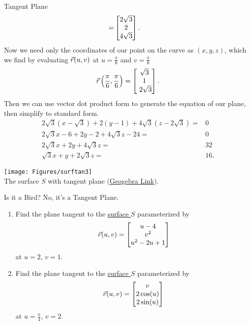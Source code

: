 \begin{example}{Tangent Plane}
\begin{align*}
=&\begin{bmatrix}2\sqrt{3}\\2\\4\sqrt{3}\end{bmatrix}.
\end{align*}
Now we need only the coordinates of our point on the curve as $(x,y,z)$, which we find by evaluating $\vec{r}(u,v)$ at $u=\frac{\pi}{6}$ and $v=\frac{\pi}{6}$
$$\vec{r}\left(\frac{\pi}{6},\frac{\pi}{6} \right)=\begin{bmatrix}\sqrt{3}\\1\\\ 2\sqrt{3}\end{bmatrix}. $$
Then we can use vector dot product form to generate the equation of our plane, then simplify to standard form.
\begin{align*}
2\sqrt{3}(x-\sqrt{3})+2(y-1)+4\sqrt{3}(z-2\sqrt{3})=&0\\
2\sqrt{3}x-6+2y-2+4\sqrt{3}z-24=&0\\
2\sqrt{3}x+2y+4\sqrt{3}z=&32\\
\sqrt{3}x+y+2\sqrt{3}z=&16.
\end{align*}\begin{center}
\texttt{[image: Figures/surftan3]}\\
The surface $S$ with tangent plane (\href{https://www.geogebra.org/3d/psngscyc}{Geogebra Link}).
\end{center}
\end{example}

\begin{exercise}{Is it a Bird? No, it's a Tangent Plane.}
\begin{enumerate}
\item Find the plane tangent to the \href{https://www.geogebra.org/3d/ympnc8vk}{surface $S$} parameterized by $$\vec{r}(u,v)=\begin{bmatrix}u-4\\v^2\\u^2-2u+1\end{bmatrix}$$ at $u=2$, $v=1$.
\vspace{1em}
\item Find the plane tangent to the \href{https://www.geogebra.org/3d/dkmxdxkq}{surface $S$} parameterized by $$\vec{r}(u,v)=\begin{bmatrix}v\\2\cos(u)\\2\sin(u)\end{bmatrix}$$ at $u=\frac{\pi}{4}$, $v=2$.
\end{enumerate}
\end{exercise}